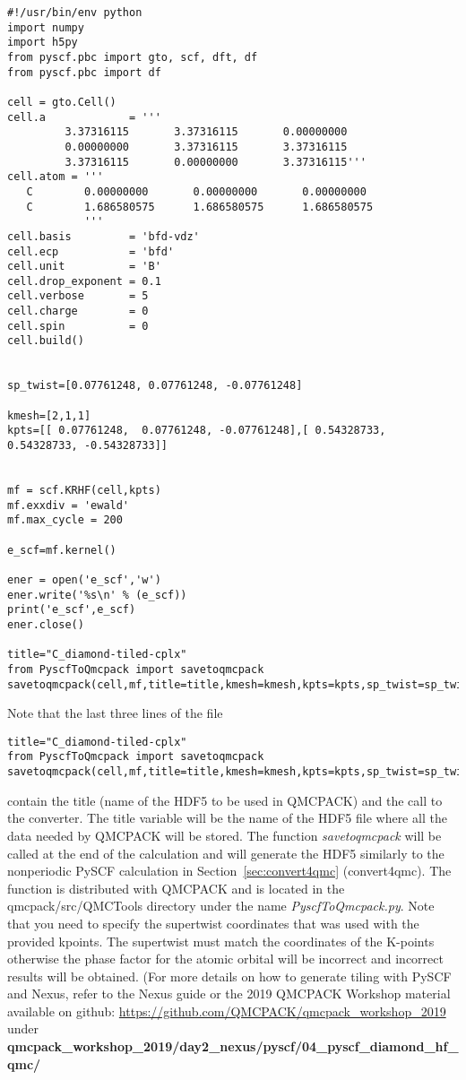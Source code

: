 \begin{lstlisting}[style=Python,caption=Example PySCF input for single k-point calculation for a $2 \times 1 \times 1$ carbon supercell.]
#!/usr/bin/env python
import numpy
import h5py
from pyscf.pbc import gto, scf, dft, df
from pyscf.pbc import df

cell = gto.Cell()
cell.a             = '''
         3.37316115       3.37316115       0.00000000
         0.00000000       3.37316115       3.37316115
         3.37316115       0.00000000       3.37316115'''
cell.atom = '''  
   C        0.00000000       0.00000000       0.00000000
   C        1.686580575      1.686580575      1.686580575 
            '''
cell.basis         = 'bfd-vdz'
cell.ecp           = 'bfd'
cell.unit          = 'B'
cell.drop_exponent = 0.1
cell.verbose       = 5
cell.charge        = 0
cell.spin          = 0
cell.build()


sp_twist=[0.07761248, 0.07761248, -0.07761248]

kmesh=[2,1,1]
kpts=[[ 0.07761248,  0.07761248, -0.07761248],[ 0.54328733,  0.54328733, -0.54328733]]


mf = scf.KRHF(cell,kpts)
mf.exxdiv = 'ewald'
mf.max_cycle = 200

e_scf=mf.kernel()

ener = open('e_scf','w')
ener.write('%s\n' % (e_scf))
print('e_scf',e_scf)
ener.close()

title="C_diamond-tiled-cplx"
from PyscfToQmcpack import savetoqmcpack
savetoqmcpack(cell,mf,title=title,kmesh=kmesh,kpts=kpts,sp_twist=sp_twist)

\end{lstlisting}

Note that the last three lines of the file
\begin{lstlisting}[style=Python]
title="C_diamond-tiled-cplx"
from PyscfToQmcpack import savetoqmcpack
savetoqmcpack(cell,mf,title=title,kmesh=kmesh,kpts=kpts,sp_twist=sp_twist)
\end{lstlisting}

contain the title (name of the HDF5 to be used in QMCPACK) and the call to the converter. The title variable will be the name of the
HDF5 file where all the data needed by QMCPACK will be stored.  The
function \textit{savetoqmcpack} will be called at the end of the
calculation and will generate the HDF5 similarly to the nonperiodic
PySCF calculation in Section~\ref{sec:convert4qmc} (convert4qmc). The
function is distributed with QMCPACK and is located in the
qmcpack/src/QMCTools directory under the name
\textit{PyscfToQmcpack.py}. Note that you need to specify the supertwist coordinates that was used with the provided kpoints. The supertwist must match the coordinates of the K-points otherwise the phase factor for the atomic orbital will be incorrect and incorrect results will be obtained. (For more details on how to generate tiling with PySCF and Nexus,  refer to the Nexus guide or the 2019 QMCPACK Workshop material available on github: \url{https://github.com/QMCPACK/qmcpack_workshop_2019} under \textbf{qmcpack\_workshop\_2019/day2\_nexus/pyscf/04\_pyscf\_diamond\_hf\_qmc/}

